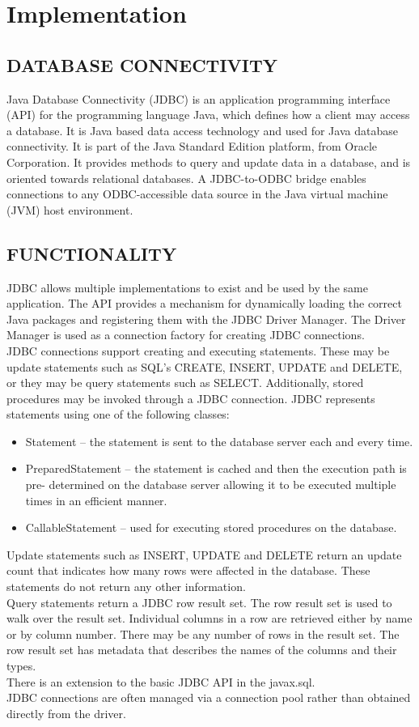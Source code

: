 \chapter{Implementation}

\section{DATABASE CONNECTIVITY}
Java Database Connectivity (JDBC) is an application programming interface (API)
for the programming language Java, which defines how a client may access a database. It is
Java based data access technology and used for Java database connectivity. It is part of the
Java Standard Edition platform, from Oracle Corporation. It provides methods to query and
update data in a database, and is oriented towards relational databases. A JDBC-to-ODBC
bridge enables connections to any ODBC-accessible data source in the Java virtual machine
(JVM) host environment.

\thispagestyle{fancy}

\section{FUNCTIONALITY}
JDBC allows multiple implementations to exist and be used by the same application.
The API provides a mechanism for dynamically loading the correct Java packages and
registering them with the JDBC Driver Manager. The Driver Manager is used as a connection
factory for creating JDBC connections.\\
JDBC connections support creating and executing statements. These may be update
statements such as SQL's CREATE, INSERT, UPDATE and DELETE, or they may be query
statements such as SELECT. Additionally, stored procedures may be invoked through a
JDBC connection. JDBC represents statements using one of the following classes:
\begin{itemize}
\item Statement – the statement is sent to the database server each and every time.
\item PreparedStatement – the statement is cached and then the execution path is pre-
determined on the database server allowing it to be executed multiple times in an
efficient manner.
\item CallableStatement – used for executing stored procedures on the database.
\end{itemize}
Update statements such as INSERT, UPDATE and DELETE return an update count that
indicates how many rows were affected in the database. These statements do not return any
other information. \\
Query statements return a JDBC row result set. The row result set is used to walk over the
result set. Individual columns in a row are retrieved either by name or by column number.
There may be any number of rows in the result set. The row result set has metadata that
describes the names of the columns and their types. \\
There is an extension to the basic JDBC API in the javax.sql. \\ 
JDBC connections are often managed via a connection pool rather than obtained directly
from the driver.
\thispagestyle{fancy}

